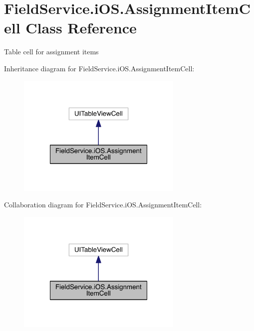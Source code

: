 \hypertarget{class_field_service_1_1i_o_s_1_1_assignment_item_cell}{\section{Field\+Service.\+i\+O\+S.\+Assignment\+Item\+Cell Class Reference}
\label{class_field_service_1_1i_o_s_1_1_assignment_item_cell}
}


Table cell for assignment items  




Inheritance diagram for Field\+Service.\+i\+O\+S.\+Assignment\+Item\+Cell\+:
\nopagebreak
\begin{figure}[H]
\begin{center}
\leavevmode
\includegraphics[width=224pt]{class_field_service_1_1i_o_s_1_1_assignment_item_cell__inherit__graph}
\end{center}
\end{figure}


Collaboration diagram for Field\+Service.\+i\+O\+S.\+Assignment\+Item\+Cell\+:
\nopagebreak
\begin{figure}[H]
\begin{center}
\leavevmode
\includegraphics[width=224pt]{class_field_service_1_1i_o_s_1_1_assignment_item_cell__coll__graph}
\end{center}
\end{figure}
